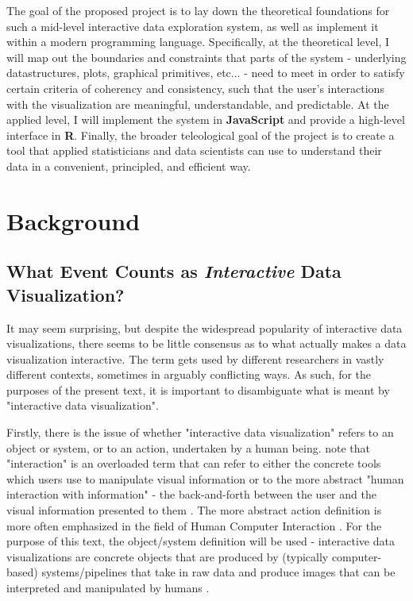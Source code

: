 \documentclass[12pt,a4paper]{article}
\begin{document}
The goal of the proposed project is to lay down the theoretical foundations for such a mid-level interactive data exploration system, as well as implement it within a modern programming language. Specifically, at the theoretical level, I will map out the boundaries and constraints that parts of the system - underlying datastructures, plots, graphical primitives, etc... - need to meet in order to satisfy certain criteria of coherency and consistency, such that the user's interactions with the visualization are meaningful, understandable, and predictable. At the applied level, I will implement the system in \textbf{JavaScript} and provide a high-level interface in \textbf{R}. Finally, the broader teleological goal of the project is to create a tool that applied statisticians and data scientists can use to understand their data in a convenient, principled, and efficient way. 

\section{Background}
\label{sec:background}

\subsection{What Event Counts as \textit{Interactive} Data Visualization?}
\label{sec:whatcounts}

It may seem surprising, but despite the widespread popularity of interactive data visualizations, there seems to be little consensus as to what actually makes a data visualization interactive. The term gets used by different researchers in vastly different contexts, sometimes in arguably conflicting ways. As such, for the purposes of the present text, it is important to disambiguate what is meant by "interactive data visualization".  

Firstly, there is the issue of whether "interactive data visualization" refers to an object or system, or to an action, undertaken by a human being. \cite{pike2009} note that 
"interaction" is an overloaded term that can refer to either the concrete tools which users use to manipulate visual information or to the more abstract "human interaction with information" - the back-and-forth between the user and the visual information presented to them \citep[see also][]{yi2007}. The more abstract action definition is more often emphasized in the field of Human Computer Interaction \citep[see e.g.][]{sinha2010}. For the purpose of this text, the object/system definition will be used - interactive data visualizations are concrete objects that are produced by (typically computer-based) systems/pipelines that take in raw data and produce images that can be interpreted and manipulated by humans \citep{brodbeck2009}.
\end{document}
